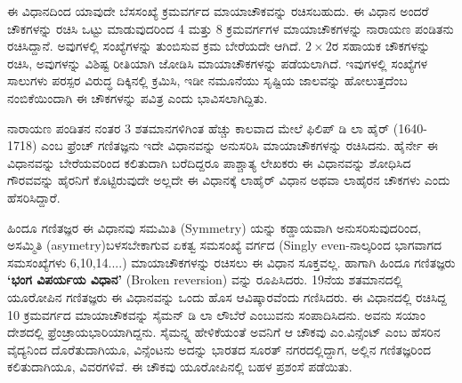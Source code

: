 ಈ ವಿಧಾನದಿಂದ ಯಾವುದೇ ಬೆಸಸಂಖ್ಯೆ ಕ್ರಮವರ್ಗದ ಮಾಯಾಚೌಕವನ್ನು ರಚಿಸಬಹುದು. ಈ ವಿಧಾನ ಅಂದರೆ ಚೌಕಗಳನ್ನು ರಚಿಸಿ ಒಟ್ಟು ಮಾಡುವುದರಿಂದ 4 ಮತ್ತು 8 ಕ್ರಮವರ್ಗಗಳ ಮಾಯಾಚೌಕಗಳನ್ನು ನಾರಾಯಣ ಪಂಡಿತನು ರಚಿಸಿದ್ದಾನೆ. ಅವುಗಳಲ್ಲಿ ಸಂಖ್ಯೆಗಳನ್ನು ತುಂಬಿಸುವ ಕ್ರಮ ಬೇರೆಯದೇ ಆಗಿದೆ. $2 \times 2$ರ ಸಹಾಯಕ ಚೌಕಗಳನ್ನು ರಚಿಸಿ, ಅವುಗಳನ್ನು ವಿಶಿಷ್ಟ ರೀತಿಯಾಗಿ ಜೋಡಿಸಿ ಮಾಯಾಚೌಕಗಳನ್ನು ಪಡೆಯಲಾಗಿದೆ. ಇವುಗಳಲ್ಲಿ ಸಂಖ್ಯೆಗಳ ಸಾಲುಗಳು ಪರಸ್ಪರ ವಿರುದ್ಧ ದಿಕ್ಕಿನಲ್ಲಿ ಕ್ರಮಿಸಿ, ಇಡೀ ನಮೂನೆಯು ಸೃಷ್ಟಿಯ ಜಾಲವನ್ನು ಹೋಲುತ್ತದೆಂಬ ನಂಬಿಕೆಯಿಂದಾಗಿ ಈ ಚೌಕಗಳನ್ನು ಪವಿತ್ರ ಎಂದು ಭಾವಿಸಲಾಗಿದ್ದಿತು.

ನಾರಾಯಣ ಪಂಡಿತನ ನಂತರ 3 ಶತಮಾನಗಳಿಗಿಂತ ಹೆಚ್ಚು ಕಾಲವಾದ ಮೇಲೆ ಫಿಲಿಪ್ ಡಿ ಲಾ ಹೈರ್ (1640-1718) ಎಂಬ ಫ್ರೆಂಚ್ ಗಣಿತಜ್ಞನು ಇದೇ ವಿಧಾನವನ್ನು ಅನುಸರಿಸಿ ಮಾಯಾಚೌಕಗಳನ್ನು ರಚಿಸಿದನು. ಹೈರ್ನೇ ಈ ವಿಧಾನವನ್ನು ಬೇರೆಯವರಿಂದ ಕಲಿತುದಾಗಿ ಬರೆದಿದ್ದರೂ ಪಾಶ್ಚಾತ್ಯ ಲೇಖಕರು ಈ ವಿಧಾನವನ್ನು ಶೋಧಿಸಿದ ಗೌರವವನ್ನು ಹೈರನಿಗೆ ಕೊಟ್ಟಿರುವುದೇ ಅಲ್ಲದೇ ಈ ವಿಧಾನಕ್ಕೆ ಲಾಹೈರ್ ವಿಧಾನ ಅಥವಾ ಲಾಹೈರನ ಚೌಕಗಳು ಎಂದು ಹೆಸರಿಸಿದ್ದಾರೆ.

ಹಿಂದೂ ಗಣಿತಜ್ಞರ ಈ ವಿಧಾನವು ಸಮಮಿತಿ (Symmetry) ಯನ್ನು ಕಡ್ಡಾಯವಾಗಿ ಅನುಸರಿಸುವುದರಿಂದ, ಅಸಮ್ಮಿತಿ (asymetry)ಬಳಸಬೇಕಾಗುವ ಏಕತ್ವ ಸಮಸಂಖ್ಯೆ ವರ್ಗದ (Singly even-ನಾಲ್ಕರಿಂದ ಭಾಗವಾಗದ ಸಮಸಂಖ್ಯೆಗಳು 6,10,14....) ಮಾಯಾಚೌಕಗಳನ್ನು ರಚಿಸಲು ಈ ವಿಧಾನ ಸೂಕ್ತವಲ್ಲ. ಹಾಗಾಗಿ ಹಿಂದೂ ಗಣಿತಜ್ಞರು \textbf{‘ಭಂಗ ವಿಪರ್ಯಯ ವಿಧಾನ’} (Broken reversion) ವನ್ನು ರೂಪಿಸಿದರು. 19ನೆಯ ಶತಮಾನದಲ್ಲಿ ಯೂರೋಪಿನ ಗಣಿತಜ್ಞರು ಈ ವಿಧಾನವನ್ನು ಒಂದು ಹೊಸ ಆವಿಷ್ಕಾರವೆಂದು ಗಣಿಸಿದರು. ಈ ವಿಧಾನದಲ್ಲಿ  ರಚಿಸಿದ್ದ 10 ಕ್ರಮವರ್ಗದ ಮಾಯಾಚೌಕವನ್ನು ಸೈಮನ್ ಡಿ ಲಾ ಲೌಬೆರೆ ಎಂಬುವನು ಸಂಪಾದಿಸಿದನು. ಅವನು ಸಯಾಂ ದೇಶದಲ್ಲಿ ಫ್ರೆಂಚ್ರಾಯಭಾರಿಯಾಗಿದ್ದನು. ಸೈಮನ್ನ್ನ ಹೇಳಿಕೆಯಂತೆ ಅವನಿಗೆ ಆ ಚೌಕವು ಎಂ.ವಿನ್ಸೆಂಟ್ ಎಂಬ ಹೆಸರಿನ ವೈದ್ಯನಿಂದ ದೊರೆತುದಾಗಿಯೂ, ವಿನ್ಸೆಂಟನು ಅದನ್ನು ಭಾರತದ ಸೂರತ್ ನಗರದಲ್ಲಿದ್ದಾಗ, ಅಲ್ಲಿನ ಗಣಿತಜ್ಞರಿಂದ ಕಲಿತುದಾಗಿಯೂ, ವಿವರಗಳಿವೆ. ಈ ಚೌಕವು ಯೂರೋಪಿನಲ್ಲಿ ಬಹಳ ಪ್ರಶಂಸೆ ಪಡೆಯಿತು.

